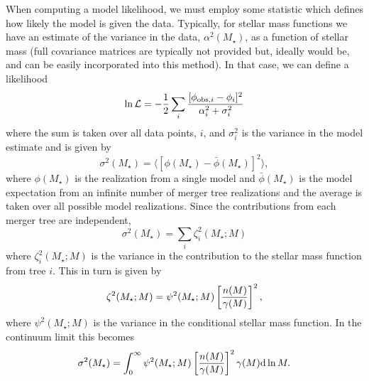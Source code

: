 When computing a model likelihood, we must employ some statistic which defines how likely the model is given the data. Typically, for stellar mass functions we have an estimate of the variance in the data, $\alpha^2(M_\star)$, as a function of stellar mass (full covariance matrices are typically not provided but, ideally would be, and can be easily incorporated into this method). In that case, we can define a likelihood
\begin{equation}
 \ln \mathcal{L} = - {1 \over 2} \sum_i {[\phi_{\mathrm{obs},i} - \phi_i]^2 \over \alpha_i^2 + \sigma_i^2}
\end{equation}
where the sum is taken over all data points, $i$, and $\sigma_i^2$ is the variance in the model estimate and is given by
\begin{equation}
 \sigma^2(M_\star) = \langle [\phi(M_\star) - \bar{\phi}(M_\star)]^2 \rangle,
\end{equation}
where $\phi(M_\star)$ is the realization from a single model and $\bar{\phi}(M_\star)$ is the model expectation from an infinite number of merger tree realizations and the average is taken over all possible model realizations. Since the contributions from each merger tree are independent, 
\begin{equation}
 \sigma^2(M_\star) = \sum_i \zeta_i^2(M_\star;M)
\end{equation}
where $\zeta_i^2(M_\star;M)$ is the variance in the contribution to the stellar mass function from tree $i$. This in turn is given by
\begin{equation}
 \zeta^2(M_\star;M) = \psi^2(M_\star;M) \left[{n(M) \over \gamma(M)}\right]^2,
\end{equation}
where $\psi^2(M_\star;M)$ is the variance in the conditional stellar mass function. In the continuum limit this becomes
\begin{equation}
 \sigma^2(M_\star) = \int_0^\infty \psi^2(M_\star;M) \left[{n(M) \over \gamma(M)}\right]^2 \gamma(M) \d \ln M.
\end{equation}

